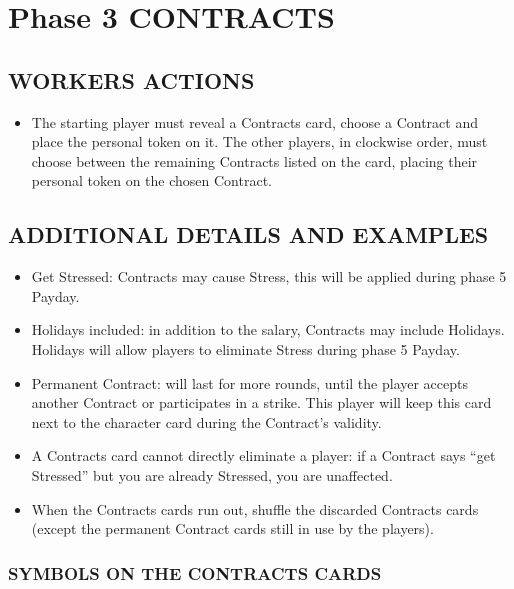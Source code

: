 \section{Phase 3 CONTRACTS}

    \subsection{WORKERS ACTIONS}

        \begin{itemize}
            \item The starting player must reveal a Contracts card, choose a Contract and
            place the personal token on it. The other players, in clockwise order, must
            choose between the remaining Contracts listed on the card, placing their
            personal token on the chosen Contract.
        \end{itemize}
    
    \subsection{ADDITIONAL DETAILS AND EXAMPLES}

        \begin{itemize}
            \item Get Stressed: Contracts may cause Stress, this will be applied during phase
            5 Payday.
            \item Holidays included: in addition to the salary, Contracts may include Holidays.
            Holidays will allow players to eliminate Stress during phase 5 Payday.
            \item Permanent Contract: will last for more rounds, until the player accepts another
            Contract or participates in a strike. This player will keep this card next
            to the character card during the Contract's validity.
            \item A Contracts card cannot directly eliminate a player: if a Contract says “get
            Stressed” but you are already Stressed, you are unaffected.
            \item When the Contracts cards run out, shuffle the discarded Contracts cards (except
            the permanent Contract cards still in use by the players).
        \end{itemize}

        \subsubsection{SYMBOLS ON THE CONTRACTS CARDS}

